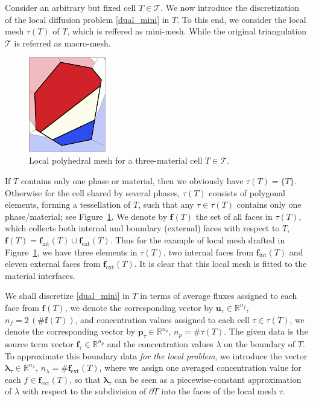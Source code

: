 \documentclass[12pt]{article}
\newcommand{\vect}[1]{\boldsymbol{\mathbf{#1}}}
\newcommand{\bcell}{T}
\newcommand{\bmesh}{{\vect{\mathcal T}}}
\newcommand{\mmesh}{{\vect{\mathcal \tau}}}
\newcommand{\mfaces}[1][]{{\vect{ f}_{\text{#1}}}}
\begin{document}
        Consider an arbitrary but fixed cell $T\in\bmesh$. We now introduce the discretization of the local diffusion problem \eqref{dual_mini} in $T$.
        To this end, we consider the local mesh $\mmesh(T)$ of $T$, which is reffered as mini-mesh. While the original triangulation $\bmesh$ is referred as macro-mesh.
\begin{figure}
\vspace{-10pt}
  \begin{center}
    \includegraphics[width=0.3\textwidth]{./ring_mini_voronoi_cell.png}%
    \caption{Local polyhedral mesh for a three-material cell $T\in\bmesh$.\label{fig:mmesh}}
  \end{center}
  \vspace{-15pt}
  \vspace{1pt}
\end{figure}
If $T$ contains only one phase or material, then we obviously have $\mmesh(T) = \{\bcell\}$. Otherwise for the cell shared by several phases, $\mmesh(T)$ consists of polygonal elements, forming a tessellation of $T$, such that any ${\tau \in \mmesh(T)}$ contains only one phase/material; see Figure~\ref{fig:mmesh}. We denote by $\mfaces(T)$ the set of all faces in $\mmesh(T)$, which collects both   internal and boundary (external) faces with respect to $T$,  $\mfaces(T) = \mfaces[int](T) \cup \mfaces[ext](T)$. Thus for the example of local mesh drafted in Figure~\ref{fig:mmesh}, we have three elements in $\mmesh(T)$, two internal faces from $\mfaces[int](T)$ and eleven external faces from $\mfaces[ext](T)$. It is clear that this local mesh is fitted to the material interfaces.


We shall discretize \eqref{dual_mini} in $T$ in terms of average fluxes assigned to each face from $\mfaces(T)$,
we denote the corresponding vector by ${\vect u}_\mmesh\in\mathbb{R}^{n_f}$, $n_f=2\,(\#\mfaces(T))$,  and concentration values assigned to each cell  ${\tau \in \mmesh(T)}$, we denote the corresponding vector by ${\vect p}_\mmesh\in\mathbb{R}^{n_p}$, $n_p=\#\mmesh(T)$. The given data is the source term vector ${\vect f}_\mmesh\in \mathbb{R}^{n_p}$ and the concentration values $\lambda$ on the boundary of $T$.
To approximate this boundary data \emph{for the local problem}, we introduce the vector
${\vect \lambda}_\mmesh\in\mathbb{R}^{n_\lambda}$, $n_\lambda=\#\mfaces[ext](T)$,
where we assign one averaged concentration value for each $f\in\mfaces[ext](T)$, so that ${\vect \lambda}_\mmesh$ can be seen as a piecewise-constant approximation of $\lambda$ with respect to the subdivision of $\partial T$ into the faces of the local mesh $\mmesh$.
\end{document}
